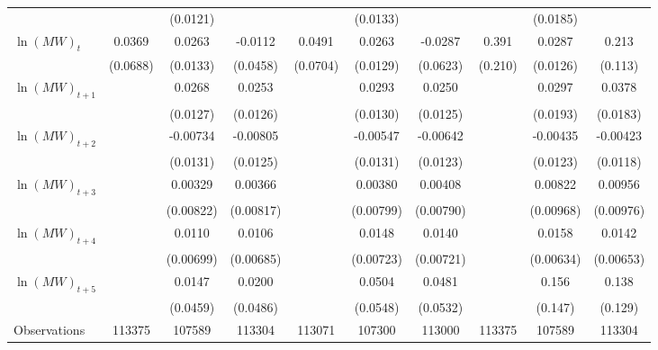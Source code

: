 {\begin{tabular}{l*{9}{c}}
          &                  & (0.0121)         &                  &                  & (0.0133)         &                  &                  & (0.0185)         &                  \\
[1em]
$\ln(MW)_{t}$&   0.0369         &   0.0263\sym{*}  &  -0.0112         &   0.0491         &   0.0263\sym{**} &  -0.0287         &    0.391\sym{*}  &   0.0287\sym{**} &    0.213\sym{*}  \\
          & (0.0688)         & (0.0133)         & (0.0458)         & (0.0704)         & (0.0129)         & (0.0623)         &  (0.210)         & (0.0126)         &  (0.113)         \\
[1em]
$\ln(MW)_{t+1}$&                  &   0.0268\sym{**} &   0.0253\sym{*}  &                  &   0.0293\sym{**} &   0.0250\sym{*}  &                  &   0.0297         &   0.0378\sym{**} \\
          &                  & (0.0127)         & (0.0126)         &                  & (0.0130)         & (0.0125)         &                  & (0.0193)         & (0.0183)         \\
[1em]
$\ln(MW)_{t+2}$&                  & -0.00734         & -0.00805         &                  & -0.00547         & -0.00642         &                  & -0.00435         & -0.00423         \\
          &                  & (0.0131)         & (0.0125)         &                  & (0.0131)         & (0.0123)         &                  & (0.0123)         & (0.0118)         \\
[1em]
$\ln(MW)_{t+3}$&                  &  0.00329         &  0.00366         &                  &  0.00380         &  0.00408         &                  &  0.00822         &  0.00956         \\
          &                  &(0.00822)         &(0.00817)         &                  &(0.00799)         &(0.00790)         &                  &(0.00968)         &(0.00976)         \\
[1em]
$\ln(MW)_{t+4}$&                  &   0.0110         &   0.0106         &                  &   0.0148\sym{**} &   0.0140\sym{*}  &                  &   0.0158\sym{**} &   0.0142\sym{**} \\
          &                  &(0.00699)         &(0.00685)         &                  &(0.00723)         &(0.00721)         &                  &(0.00634)         &(0.00653)         \\
[1em]
$\ln(MW)_{t+5}$&                  &   0.0147         &   0.0200         &                  &   0.0504         &   0.0481         &                  &    0.156         &    0.138         \\
          &                  & (0.0459)         & (0.0486)         &                  & (0.0548)         & (0.0532)         &                  &  (0.147)         &  (0.129)         \\
\hline
Observations&   113375         &   107589         &   113304         &   113071         &   107300         &   113000         &   113375         &   107589         &   113304         \\
\hline\hline
\end{tabular}
}
